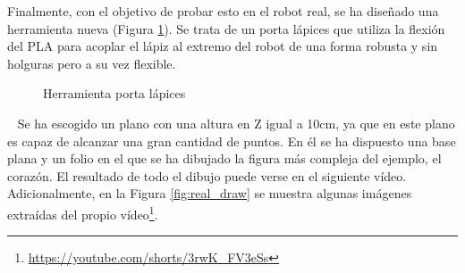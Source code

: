 Finalmente, con el objetivo de probar esto en el robot real, se ha diseñado una herramienta nueva (Figura \ref{fig:pen_tool}). Se trata de un porta lápices que utiliza la 
flexión del PLA para acoplar el lápiz al extremo del robot de una forma robusta y sin holguras pero a su vez flexible.
\begin{figure} [ht!]
    \centering  
    \hspace{1cm}
    \caption{Herramienta porta lápices}
    \label{fig:pen_tool}
\end{figure}\ 
\newpage
Se ha escogido un plano con una altura en Z igual a 10cm, ya que en este plano es capaz de alcanzar una gran cantidad de puntos. En él se ha dispuesto 
una base plana y un folio en el que se ha dibujado la figura más compleja del ejemplo, el corazón. El resultado de todo el dibujo puede verse en el siguiente 
vídeo. Adicionalmente, en la Figura \ref{fig:real_draw} se muestra algunas imágenes extraídas del propio vídeo\footnote{\url{https://youtube.com/shorts/3rwK_FV3eSs}}.

